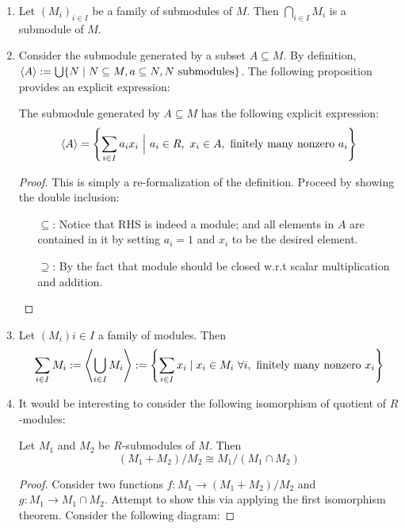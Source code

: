 \begin{enumerate}
    \item Let $(M_i)_{i\in I}$ be a family of submodules of $M$. Then $\bigcap_{i\in I} M_i$ is a submodule of $M$. 
    \item Consider the submodule generated by a subset $A \subseteq M$. By definition, $\left\langle A \right\rangle := \bigcup\{N \mid N\subseteq M, a\subseteq N, N \text{ submodules}\}$. The following proposition provides an explicit expression:
        \begin{proposition}\label{prop:Explicit Expression of Generated Submodules}
            The submodule generated by $A\subseteq M$ has the following explicit expression:
            \[
                \left\langle A \right\rangle = \left\{ \sum\limits_{i\in I} a_i x_i \ \Big|\  a_i \in R,\ x_i\in A, \text{ finitely many nonzero } a_i \right\}
            \]
        \end{proposition}

        \begin{proof}
            This is simply a re-formalization of the definition. Proceed by showing the double inclusion:
            \begin{itemize}
                \item[$\subseteq$:] Notice that RHS is indeed a module; and all elements in $A$ are contained in it by setting $a_i = 1$ and $x_i$ to be the desired element.
                \item[$\supseteq$:] By the fact that module should be closed w.r.t scalar multiplication and addition.
            \end{itemize}
        \end{proof}
    \item Let $(M_i)i\in I$ a family of modules. Then
        \[
            \sum\limits_{i\in I} M_i := \left\langle \bigcup_{i\in I} M_i \right\rangle := \left\{ \sum\limits_{i\in I} x_i \mid x_i\in M_i\ \forall i, \text{ finitely many nonzero } x_i \right\}
        \]
    \item It would be interesting to consider the following isomorphism of quotient of $R$-modules:
        \begin{theorem}\label{thm:Third Isomorphism Theorem}
            Let $M_1$ and $M_2$ be $R$-submodules of $M$. Then 
            \[
                (M_1 + M_2)/M_2 \cong M_1/(M_1 \cap M_2)  
            \]
         \end{theorem}

         \begin{proof}
            Consider two functions $f: M_1 \to (M_1 + M_2)/M_2$ and $g: M_1 \to M_1\cap M_2$. Attempt to show this via applying the first isomorphism theorem. Consider the following diagram:
            

\end{proof}
\end{enumerate}
